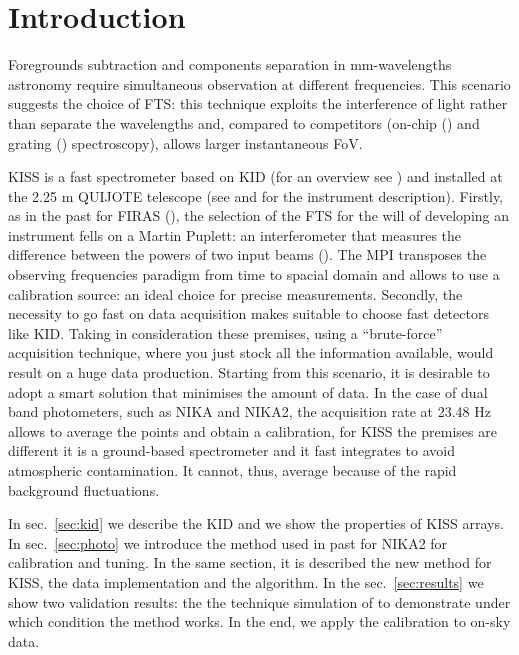 \documentclass[twocolumn,traditabstract]{aa}\\
\begin{document}
\section{Introduction}

Foregrounds subtraction and components separation in mm-wavelengths astronomy require simultaneous observation at different frequencies. This scenario suggests the choice of FTS: this technique exploits the interference of light rather than separate the wavelengths and, compared to competitors (on-chip (\cite{deshima}) and grating (\cite{grating}) spectroscopy), allows larger instantaneous FoV. 

KISS is a fast spectrometer based on KID (for an overview see \cite{kids}) and installed at the 2.25 m QUIJOTE telescope (see \cite{fasano-ltd} and \cite{fasano-nika2} for the instrument description). Firstly, as in the past for FIRAS (\cite{FIRAS}), the selection of the FTS for the will of developing an instrument fells on a Martin Puplett: an interferometer that measures the difference between the powers of two input beams (\cite{mpi}). The MPI transposes the observing frequencies paradigm from time to spacial domain and allows to use a calibration source: an ideal choice for precise measurements.
Secondly, the necessity to go fast on data acquisition makes suitable to choose fast detectors like KID. Taking in consideration these premises, using a ``brute-force'' acquisition technique, where you just stock all the information available, would result on a huge data production. Starting from this scenario, it is desirable to adopt a smart solution that minimises the amount of data.
In the case of dual band photometers, such as NIKA \cite{Monfardini_2010:NIKA} and NIKA2\cite{nika2}, the acquisition rate at 23.48 Hz allows to average the points and obtain a calibration, for KISS the premises are different it is a ground-based spectrometer and it fast integrates to avoid atmospheric contamination. It cannot, thus, average because of the rapid background fluctuations.

In sec.~\ref{sec:kid} we describe the KID and we show the properties of KISS arrays. 
In sec.~\ref{sec:photo} we introduce the method used in past for NIKA2 for calibration and tuning. In the same section, it is described the new method for KISS, the data implementation and the algorithm.
In the sec.~\ref{sec:results}  we show two validation results: the the technique simulation of  to demonstrate under which condition the method works. In the end, we apply the calibration to on-sky data.
\end{document}
